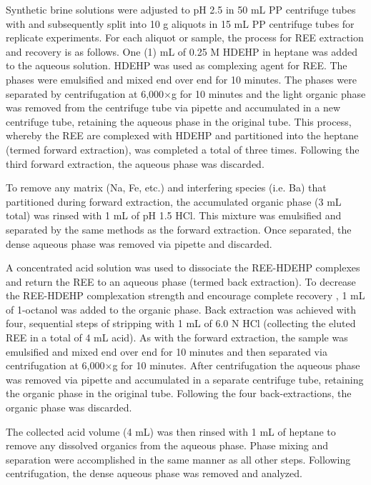 Synthetic brine solutions were adjusted to pH 2.5 in 50 mL PP centrifuge tubes with  and subsequently split into 10 g aliquots in 15 mL PP centrifuge tubes for replicate experiments.
For each aliquot or sample, the process for REE extraction and recovery is as follows.
One (1) mL of 0.25 M HDEHP in heptane was added to the aqueous solution.
HDEHP was used as complexing agent for REE.
The phases were emulsified and mixed end over end for 10 minutes.
The phases were separated by centrifugation at 6,000$\times$g for 10 minutes and the light organic phase was removed from the centrifuge tube via pipette and accumulated in a new centrifuge tube, retaining the aqueous phase in the original tube.
This process, whereby the REE are complexed with HDEHP and partitioned into the heptane (termed forward extraction), was completed a total of three times.
Following the third forward extraction, the aqueous phase was discarded.

To remove any matrix (Na, Fe, etc.) and interfering species (i.e. Ba) that partitioned during forward extraction, the accumulated organic phase (3 mL total) was rinsed with 1 mL of pH 1.5 HCl.
This mixture was emulsified and separated by the same methods as the forward extraction.
Once separated, the dense aqueous phase was removed via pipette and discarded.

A concentrated acid solution was used to dissociate the REE-HDEHP complexes and return the REE to an aqueous phase (termed back extraction).
To decrease the REE-HDEHP complexation strength and encourage complete recovery \citep{Shabani_AC_1990},
1 mL of 1-octanol was added to the organic phase.
Back extraction was achieved with four, sequential steps of stripping with 1 mL of 6.0 N HCl (collecting the eluted REE in a total of 4 mL acid).
As with the forward extraction, the sample was emulsified and mixed end over end for 10 minutes and then separated via centrifugation at 6,000$\times$g for 10 minutes.
After centrifugation the aqueous phase was removed via pipette and accumulated in a separate centrifuge tube, retaining the organic phase in the original tube.
Following the four back-extractions, the organic phase was discarded.

The collected acid volume (4 mL) was then rinsed with 1 mL of heptane to remove any dissolved organics from the aqueous phase.
Phase mixing and separation were accomplished in the same manner as all other steps.
Following centrifugation, the dense aqueous phase was removed and analyzed.

